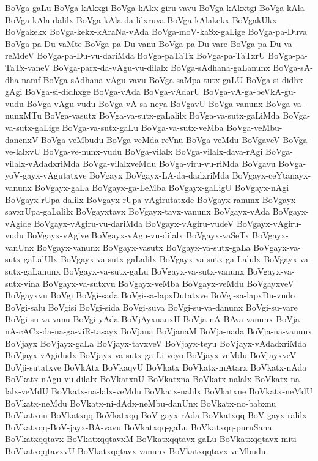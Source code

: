 {BoVga-gaLu
BoVga-kAkxgi
BoVga-kAkx-giru-vavu
BoVga-kAkxtgi
BoVga-kAla
BoVga-kAla-dalilx
BoVga-kAla-da-lilxruva
BoVga-kAlakekx
BoVgakUkx
BoVgakekx
BoVga-kekx-kAraNa-vAda
BoVga-moV-kaSx-gaLige
BoVga-pa-Duva
BoVga-pa-Du-vaMte
BoVga-pa-Du-vanu
BoVga-pa-Du-vare
BoVga-pa-Du-va-reMdeV
BoVga-pa-Du-vu-dariMda
BoVga-paTaTx
BoVga-pa-TaTxrU
BoVga-pa-TaTx-vaneV
BoVga-parx-da-vAgu-vu-dilalx
BoVga-sAdhana-gaLanunx
BoVga-sA-dha-namf
BoVga-sAdhana-vAgu-vavu
BoVga-saMpa-tutx-gaLU
BoVga-si-didhx-gAgi
BoVga-si-didhxge
BoVga-vAda
BoVga-vAdarU
BoVga-vA-ga-beVkA-gu-vudu
BoVga-vAgu-vudu
BoVga-vA-sa-neya
BoVgavU
BoVga-vanunx
BoVga-va-nunxMTu
BoVga-vasutx
BoVga-va-sutx-gaLalilx
BoVga-va-sutx-gaLiMda
BoVga-va-sutx-gaLige
BoVga-va-sutx-gaLu
BoVga-va-sutx-veMba
BoVga-veMbu-danenxV
BoVga-veMbudu
BoVga-veMda-reVnu
BoVga-veMdu
BoVgaveV
BoVga-ve-lalxvU
BoVga-ve-nunx-vudu
BoVga-vilalx
BoVga-vilalx-dava-rAgi
BoVga-vilalx-vAdadxriMda
BoVga-vilalxveMdu
BoVga-viru-vu-riMda
BoVgavu
BoVga-yoV-gayx-vAgutatxve
BoVgayx
BoVgayx-LA-da-dadxriMda
BoVgayx-ceYtanayx-vanunx
BoVgayx-gaLa
BoVgayx-ga-LeMba
BoVgayx-gaLigU
BoVgayx-nAgi
BoVgayx-rUpa-dalilx
BoVgayx-rUpa-vAgirutatxde
BoVgayx-ranunx
BoVgayx-savxrUpa-gaLalilx
BoVgayxtavx
BoVgayx-tavx-vanunx
BoVgayx-vAda
BoVgayx-vAgide
BoVgayx-vAgiru-vu-dariMda
BoVgayx-vAgiru-vudeV
BoVgayx-vAgiru-vudu
BoVgayx-vAgive
BoVgayx-vAgu-vu-dilalx
BoVgayx-vaSeTx
BoVgayx-vanUnx
BoVgayx-vanunx
BoVgayx-vasutx
BoVgayx-va-sutx-gaLa
BoVgayx-va-sutx-gaLalUlx
BoVgayx-va-sutx-gaLalilx
BoVgayx-va-sutx-ga-Lalulx
BoVgayx-va-sutx-gaLanunx
BoVgayx-va-sutx-gaLu
BoVgayx-va-sutx-vanunx
BoVgayx-va-sutx-vina
BoVgayx-va-sutxvu
BoVgayx-veMba
BoVgayx-veMdu
BoVgayxveV
BoVgayxvu
BoVgi
BoVgi-sada
BoVgi-sa-lapxDutatxve
BoVgi-sa-lapxDu-vudo
BoVgi-salu
BoVgisi
BoVgi-sida
BoVgi-suva
BoVgi-su-va-danunx
BoVgi-su-vare
BoVgi-su-va-vanu
BoVgi-yAda
BoVjAyxnanxH
BoVja-nA-BAva-vanunx
BoVja-nA-cACx-da-na-ga-viR-tasayx
BoVjana
BoVjanaM
BoVja-nada
BoVja-na-vanunx
BoVjayx
BoVjayx-gaLa
BoVjayx-tavxveV
BoVjayx-teyu
BoVjayx-vAdadxriMda
BoVjayx-vAgidudx
BoVjayx-va-sutx-ga-Li-veyo
BoVjayx-veMdu
BoVjayxveV
BoVji-sutatxve
BoVkAtx
BoVkaqvU
BoVkatx
BoVkatx-mAtarx
BoVkatx-nAda
BoVkatx-nAgu-vu-dilalx
BoVkatxnU
BoVkatxna
BoVkatx-nalalx
BoVkatx-na-lalx-veMdU
BoVkatx-na-lalx-veMdu
BoVkatx-nalilx
BoVkatxne
BoVkatx-neMdU
BoVkatx-neMdu
BoVkatx-ni-dAdx-neMbu-danUnx
BoVkatx-no-babxnu
BoVkatxnu
BoVkatxqq
BoVkatxqq-BoV-gayx-rAda
BoVkatxqq-BoV-gayx-ralilx
BoVkatxqq-BoV-jayx-BA-vavu
BoVkatxqq-gaLu
BoVkatxqq-puruSana
BoVkatxqqtavx
BoVkatxqqtavxM
BoVkatxqqtavx-gaLu
BoVkatxqqtavx-miti
BoVkatxqqtavxvU
BoVkatxqqtavx-vanunx
BoVkatxqqtavx-veMbudu
}
